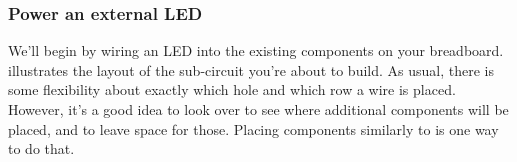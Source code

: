 \subsubsection{\howto Power an external LED}
We'll begin by wiring an LED into the existing components on your breadboard. 
 illustrates the layout of the sub-circuit you're about to build.
As usual, there is some flexibility about exactly which hole and which row a wire is placed. 
However, it's a good idea to look over  to see where additional components will be placed, and to leave space for those.
Placing components similarly to  is one way to do that. 
\begin{marginfigure}[-8cm]
	\begin{center}

\end{center}
\end{marginfigure}
